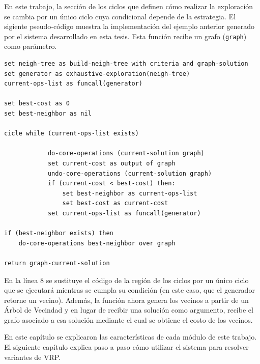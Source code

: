 En este trabajo, la sección de los ciclos que definen cómo realizar la exploración se cambia por un único ciclo cuya condicional depende de la estrategia. El sigiente pseudo-código muestra la implementación del ejemplo anterior generado por el sistema desarrollado en esta tesis. Esta función recibe un grafo (\texttt{graph}) como parámetro.

\begin{lstlisting}
set neigh-tree as build-neigh-tree with criteria and graph-solution
set generator as exhaustive-exploration(neigh-tree)
current-ops-list as funcall(generator)

set best-cost as 0
set best-neighbor as nil

cicle while (current-ops-list exists)
			
			do-core-operations (current-solution graph)
			set current-cost as output of graph
			undo-core-operations (current-solution graph)
			if (current-cost < best-cost) then:
				set best-neighbor as current-ops-list
				set best-cost as current-cost
			set current-ops-list as funcall(generator)

if (best-neighbor exists) then
	do-core-operations best-neighbor over graph

return graph-current-solution
\end{lstlisting}

En la línea 8 se sustituye el código de la región de los ciclos por un único ciclo que se ejecutará mientras se cumpla su condición (en este caso, que el generador retorne un vecino). Además, la función ahora genera los vecinos a partir de un Árbol de Vecindad y en lugar de recibir una solución como argumento, recibe el grafo asociado a esa solución mediante el cual se obtiene el costo de los vecinos.

En este capítulo se explicaron las características de cada módulo de este trabajo. El siguiente capítulo explica paso a paso cómo utilizar el sistema para resolver variantes de VRP. 










